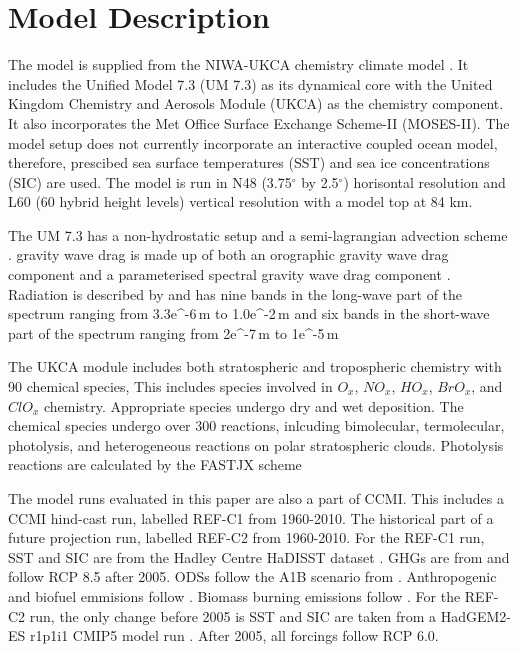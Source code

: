 \section{Model Description}

The model is supplied from the NIWA-UKCA chemistry climate model \cite{Morgenstern:2009bu}. It includes the Unified Model 7.3 (UM 7.3) as its dynamical core with the United Kingdom Chemistry and Aerosols Module (UKCA) as the chemistry component. It also incorporates the Met Office Surface Exchange Scheme-II (MOSES-II). The model setup does not currently incorporate an interactive coupled ocean model, therefore, prescibed sea surface temperatures (SST) and sea ice concentrations (SIC) are used. The model is run in N48 (3.75$^\circ$ by 2.5$^\circ$) horisontal resolution and L60 (60 hybrid height levels) vertical resolution with a model top at 84 km.

The UM 7.3 has a non-hydrostatic setup \cite{Davies:2005vu} and a semi-lagrangian advection scheme \cite{Priestley:1993ur}. gravity wave drag is made up of both an orographic gravity wave drag component \cite{Webster:2003vf} and a parameterised spectral gravity wave drag component \cite{Scaife:2002vt}. Radiation is described by \cite{Edwards:1996wo} and has nine bands in the long-wave part of the spectrum ranging from 3.3e^{-6}\,m to 1.0e^{-2}\,m and six bands in the short-wave part of the spectrum ranging from 2e^{-7}\,m to 1e^{-5}\,m

The UKCA module includes both stratospheric and tropospheric chemistry with 90 chemical species, This includes species involved in $O_x$, $NO_x$, $HO_x$, $BrO_x$, and $ClO_x$ chemistry. Appropriate species undergo dry and wet deposition. The chemical species undergo over 300 reactions, inlcuding bimolecular, termolecular, photolysis, and heterogeneous reactions on polar stratospheric clouds. Photolysis reactions are calculated by the FASTJX scheme \cite{Neu:2007wi}

The model runs evaluated in this paper are also a part of CCMI. This includes a CCMI hind-cast run, labelled REF-C1 from 1960-2010. The historical part of a future projection run, labelled REF-C2 from 1960-2010. For the REF-C1 run, SST and SIC are from the Hadley Centre HaDISST dataset \cite{Rayner:2003ty}. GHGs are from \cite{Meinshausen:2011is} \cite{Riahi:2011dk} and follow RCP 8.5 after 2005. ODSs follow the A1B scenario from \cite{WMO:2011vf}. Anthropogenic and biofuel emmisions follow \cite{Granier:2011dw}. Biomass burning emissions follow \cite{Lamarque:2011wr} \cite{vanderWerf:2006gi} \cite{Schultz:2008wf}. For the REF-C2 run, the only change before 2005 is SST and SIC are taken from a HadGEM2-ES r1p1i1 CMIP5 model run \cite{Jones:2011ii}. After 2005, all forcings follow RCP 6.0. 